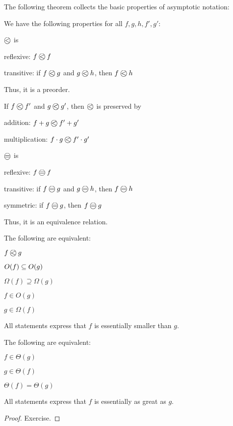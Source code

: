 The following theorem collects the basic properties of asymptotic notation:

\begin{theorem}\label{thm:ad:onot}
We have the following properties for all $f,g,h,f',g'$:
\begin{compactitem}
 \item $\Oleq{}{}$ is
	\begin{compactitem}
	 \item reflexive: $\Oleq{f}{f}$
	 \item transitive: if $\Oleq{f}{g}$ and $\Oleq{g}{h}$, then $\Oleq{f}{h}$
	\end{compactitem}
  Thus, it is a preorder.
 \item If $\Oleq{f}{f'}$ and $\Oleq{g}{g'}$, then $\Oleq{}{}$ is preserved by
	\begin{compactitem}
	 \item addition: $\Oleq{f+g}{f'+g'}$
	 \item multiplication: $\Oleq{f\cdot g}{f'\cdot g'}$
	\end{compactitem}
 \item $\Oeq{}{}$ is
	\begin{compactitem}
	 \item reflexive: $\Oeq{f}{f}$
	 \item transitive: if $\Oeq{f}{g}$ and $\Oeq{g}{h}$, then $\Oeq{f}{h}$
	 \item symmetric: if $\Oeq{f}{g}$, then $\Oeq{f}{g}$
	\end{compactitem}
  Thus, it is an equivalence relation.
 \item The following are equivalent:
 	\begin{compactitem}
 	 \item $\Oleq{f}{g}$
 	 \item $O(f)\subseteq O(g)$
 	 \item $\Omega(f)\supseteq \Omega(g)$
 	 \item $f\in O(g)$
 	 \item $g\in \Omega(f)$
 	\end{compactitem}
  All statements express that $f$ is essentially smaller than $g$.
 \item The following are equivalent:
 	\begin{compactitem}
 	 \item $f\in\Theta(g)$
 	 \item $g\in\Theta(f)$
 	 \item $\Theta(f)=\Theta(g)$
 	\end{compactitem}
  All statements express that $f$ is essentially as great as $g$.  
\end{compactitem}
\end{theorem}
\begin{proof}
Exercise.
\end{proof}

